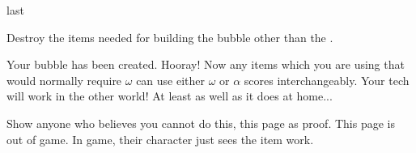 \documentclass[greennotebook]{guildcamp3} %
\begin{document}
\begin{page}[at last...]{last}
	
Destroy the items needed for building the bubble other than the \iScrewdriver{}.

Your bubble has been created. Hooray! Now any items which you are using that would normally require $\omega$ can use either $\omega$ or $\alpha$ scores interchangeably. Your tech will work in the other world! At least as well as it does at home... 

Show anyone who believes you cannot do this, this page as proof. This page is out of game. In game, their character just sees the item work. 


\end{page}



\endnotebook
\end{document}
